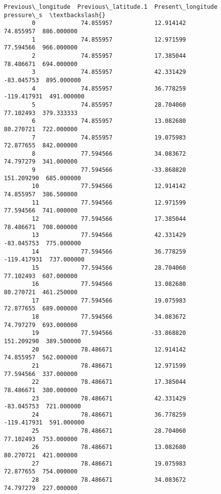 \documentclass[11pt]{article}
\begin{document}
\begin{Verbatim}[commandchars=\\\{\}]
             Previous\_longitude  Previous\_latitude.1  Present\_longitude  pressure\_s  \textbackslash{}
        0             74.855957            12.914142          74.855957  886.000000   
        1             74.855957            12.971599          77.594566  966.000000   
        2             74.855957            17.385044          78.486671  694.000000   
        3             74.855957            42.331429         -83.045753  895.000000   
        4             74.855957            36.778259        -119.417931  491.000000   
        5             74.855957            28.704060          77.102493  379.333333   
        6             74.855957            13.082680          80.270721  722.000000   
        7             74.855957            19.075983          72.877655  842.000000   
        8             77.594566            34.083672          74.797279  341.000000   
        9             77.594566           -33.868820         151.209290  685.000000   
        10            77.594566            12.914142          74.855957  386.500000   
        11            77.594566            12.971599          77.594566  741.000000   
        12            77.594566            17.385044          78.486671  708.000000   
        13            77.594566            42.331429         -83.045753  775.000000   
        14            77.594566            36.778259        -119.417931  737.000000   
        15            77.594566            28.704060          77.102493  607.000000   
        16            77.594566            13.082680          80.270721  461.250000   
        17            77.594566            19.075983          72.877655  689.000000   
        18            77.594566            34.083672          74.797279  693.000000   
        19            77.594566           -33.868820         151.209290  389.500000   
        20            78.486671            12.914142          74.855957  562.000000   
        21            78.486671            12.971599          77.594566  337.000000   
        22            78.486671            17.385044          78.486671  380.000000   
        23            78.486671            42.331429         -83.045753  721.000000   
        24            78.486671            36.778259        -119.417931  591.000000   
        25            78.486671            28.704060          77.102493  753.000000   
        26            78.486671            13.082680          80.270721  421.000000   
        27            78.486671            19.075983          72.877655  754.000000   
        28            78.486671            34.083672          74.797279  227.000000   

\end{Verbatim}
\end{document}
